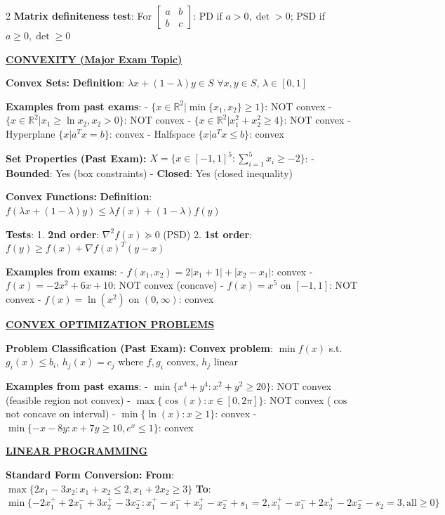 \documentclass[10pt,a4paper]{article}
\newcommand{\mysection}[1]{\vspace{3pt}\textbf{\underline{#1}}\vspace{2pt}}
\newcommand{\mysubsection}[1]{\vspace{2pt}\textbf{#1:}\vspace{1pt}}
\begin{document}
\begin{multicols}{2}
\textbf{Matrix definiteness test}:
For $\begin{bmatrix} a & b \\ b & c \end{bmatrix}$: PD if $a > 0, \det > 0$; PSD if $a \geq 0, \det \geq 0$

\mysection{CONVEXITY (Major Exam Topic)}

\mysubsection{Convex Sets}
\textbf{Definition}: $\lambda x + (1-\lambda)y \in S$ $\forall x,y \in S$, $\lambda \in [0,1]$

\textbf{Examples from past exams}:
- $\{x \in \mathbb{R}^2 | \min\{x_1,x_2\} \geq 1\}$: NOT convex
- $\{x \in \mathbb{R}^2 | x_1 \geq \ln x_2, x_2 > 0\}$: NOT convex  
- $\{x \in \mathbb{R}^2 | x_1^2 + x_2^2 \geq 4\}$: NOT convex
- Hyperplane $\{x | a^Tx = b\}$: convex
- Halfspace $\{x | a^Tx \leq b\}$: convex

\mysubsection{Set Properties (Past Exam)}
$X = \{x \in [-1,1]^5 : \sum_{i=1}^5 x_i \geq -2\}$:
- \textbf{Bounded}: Yes (box constraints)
- \textbf{Closed}: Yes (closed inequality)

\mysubsection{Convex Functions}
\textbf{Definition}: $f(\lambda x + (1-\lambda)y) \leq \lambda f(x) + (1-\lambda)f(y)$

\textbf{Tests}:
1. \textbf{2nd order}: $\nabla^2 f(x) \succeq 0$ (PSD)
2. \textbf{1st order}: $f(y) \geq f(x) + \nabla f(x)^T(y-x)$

\textbf{Examples from exams}:
- $f(x_1,x_2) = 2|x_1+1| + |x_2-x_1|$: convex
- $f(x) = -2x^2 + 6x + 10$: NOT convex (concave)
- $f(x) = x^5$ on $[-1,1]$: NOT convex
- $f(x) = \ln(x^2)$ on $(0,\infty)$: convex

\columnbreak

\mysection{CONVEX OPTIMIZATION PROBLEMS}

\mysubsection{Problem Classification (Past Exam)}
\textbf{Convex problem}: $\min f(x)$ s.t. $g_i(x) \leq b_i$, $h_j(x) = c_j$
where $f, g_i$ convex, $h_j$ linear

\textbf{Examples from past exams}:
- $\min\{x^4 + y^4 : x^2 + y^2 \geq 20\}$: NOT convex (feasible region not convex)
- $\max\{\cos(x) : x \in [0,2\pi]\}$: NOT convex ($\cos$ not concave on interval)
- $\min\{\ln(x) : x \geq 1\}$: convex
- $\min\{-x - 8y : x + 7y \geq 10, e^x \leq 1\}$: convex

\mysection{LINEAR PROGRAMMING}

\mysubsection{Standard Form Conversion}
\textbf{From}: $\max\{2x_1 - 3x_2 : x_1 + x_2 \leq 2, x_1 + 2x_2 \geq 3\}$
\textbf{To}: $\min\{-2x_1^+ + 2x_1^- + 3x_2^+ - 3x_2^- : x_1^+ - x_1^- + x_2^+ - x_2^- + s_1 = 2, x_1^+ - x_1^- + 2x_2^+ - 2x_2^- - s_2 = 3, \text{all} \geq 0\}$


\end{multicols}
\end{document}
